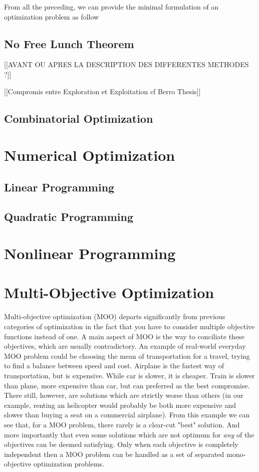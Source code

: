 From all the preceding, we can provide the minimal formulation of an optimization problem as follow 


\section{No Free Lunch Theorem}
[[AVANT OU APRES LA DESCRIPTION DES DIFFERENTES METHODES ?]]

[[Compromis entre Exploration et Exploitation cf Berro Thesis]]

\section{Combinatorial Optimization}

\chapter{Numerical Optimization}
\section{Linear Programming}
\section{Quadratic Programming}

\chapter{Nonlinear Programming}

\chapter{Multi-Objective Optimization}

Multi-objective optimization (MOO) departs significantly from previous categories of optimization in the fact that you have to consider multiple objective functions instead of one. A main aspect of MOO is the way to conciliate these objectives, which are usually contradictory.
An example of real-world everyday MOO problem could be choosing the mean of transportation for a travel, trying to find a balance between speed and cost. Airplane is the fastest way of transportation, but is expensive. While car is slower, it is cheaper. Train is slower than plane, more expensive than car, but can preferred as the best compromise. There still, however, are solutions which are strictly worse than others (in our example, renting an helicopter would probably be both more expensive and slower than buying a seat on a commercial airplane).
From this example we can see that, for a MOO problem, there rarely is a clear-cut "best" solution. And more importantly that even some solutions which are not optimum for \emph{any} of the objectives can be deemed satisfying. Only when each objective is completely independent then a MOO problem can be handled as a set of separated mono-objective optimization problems. 

